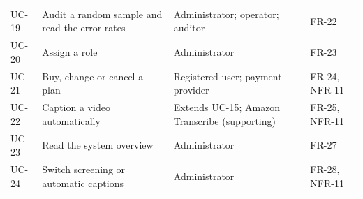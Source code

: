 \begin{table}[htbp]
\begin{tabularx}{\textwidth}{>{\raggedright\arraybackslash}p{} >{\raggedright\arraybackslash}X >{\raggedright\arraybackslash}p{} >{\raggedright\arraybackslash}p{}}
UC-19 & Audit a random sample and read the error rates & Administrator; operator; auditor & FR-22 \\
UC-20 & Assign a role & Administrator & FR-23 \\
UC-21 & Buy, change or cancel a plan & Registered user; payment provider & FR-24, NFR-11 \\
UC-22 & Caption a video automatically & Extends UC-15; Amazon Transcribe (supporting) & FR-25, NFR-11 \\
UC-23 & Read the system overview & Administrator & FR-27 \\
UC-24 & Switch screening or automatic captions & Administrator & FR-28, NFR-11 \\
\bottomrule
\end{tabularx}
\end{table}
